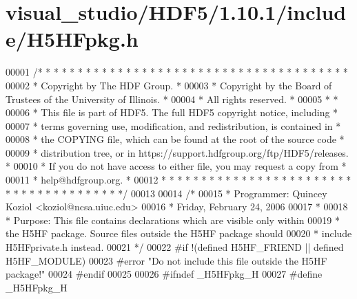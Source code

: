 \hypertarget{visual__studio_2_h_d_f5_21_810_81_2include_2_h5_h_fpkg_8h_source}{}\section{visual\+\_\+studio/\+H\+D\+F5/1.10.1/include/\+H5\+H\+Fpkg.h}
\label{visual__studio_2_h_d_f5_21_810_81_2include_2_h5_h_fpkg_8h_source}

\begin{DoxyCode}
00001 \textcolor{comment}{/* * * * * * * * * * * * * * * * * * * * * * * * * * * * * * * * * * * * * * *}
00002 \textcolor{comment}{ * Copyright by The HDF Group.                                               *}
00003 \textcolor{comment}{ * Copyright by the Board of Trustees of the University of Illinois.         *}
00004 \textcolor{comment}{ * All rights reserved.                                                      *}
00005 \textcolor{comment}{ *                                                                           *}
00006 \textcolor{comment}{ * This file is part of HDF5.  The full HDF5 copyright notice, including     *}
00007 \textcolor{comment}{ * terms governing use, modification, and redistribution, is contained in    *}
00008 \textcolor{comment}{ * the COPYING file, which can be found at the root of the source code       *}
00009 \textcolor{comment}{ * distribution tree, or in https://support.hdfgroup.org/ftp/HDF5/releases.  *}
00010 \textcolor{comment}{ * If you do not have access to either file, you may request a copy from     *}
00011 \textcolor{comment}{ * help@hdfgroup.org.                                                        *}
00012 \textcolor{comment}{ * * * * * * * * * * * * * * * * * * * * * * * * * * * * * * * * * * * * * * */}
00013 
00014 \textcolor{comment}{/*}
00015 \textcolor{comment}{ * Programmer:  Quincey Koziol <koziol@ncsa.uiuc.edu>}
00016 \textcolor{comment}{ *      Friday, February 24, 2006}
00017 \textcolor{comment}{ *}
00018 \textcolor{comment}{ * Purpose: This file contains declarations which are visible only within}
00019 \textcolor{comment}{ *      the H5HF package.  Source files outside the H5HF package should}
00020 \textcolor{comment}{ *      include H5HFprivate.h instead.}
00021 \textcolor{comment}{ */}
00022 \textcolor{preprocessor}{#if !(defined H5HF\_FRIEND || defined H5HF\_MODULE)}
00023 \textcolor{preprocessor}{#error "Do not include this file outside the H5HF package!"}
00024 \textcolor{preprocessor}{#endif}
00025 
00026 \textcolor{preprocessor}{#ifndef \_H5HFpkg\_H}
00027 \textcolor{preprocessor}{#define \_H5HFpkg\_H}

\end{DoxyCode}
